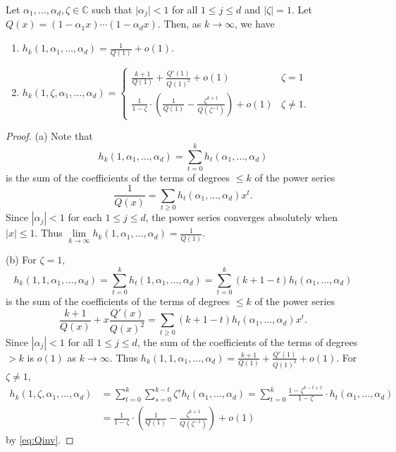 \documentclass[10pt,a4paper]{amsart}
\newcommand{\CC}{\mathbb{C}}
\begin{document}
\begin{lemma}\label{lem}
Let $\alpha_1,\dots,\alpha_d,\zeta\in \CC$ such that $\lvert \alpha_j\rvert 
<1$ for all $1\leqslant j\leqslant d$ and $\lvert \zeta\rvert = 1$. Let 
$Q(x)=(1-\alpha_1 x)\dotsm (1-\alpha_d x)$. Then, as $k\to \infty$, we have 
\begin{enumerate}
\item[(a)] $h_k(1,\alpha_1,\dots,\alpha_d)=\frac{1}{Q(1)}+o(1)$.
\item[(b)] 
    $h_k(1,\zeta,\alpha_1,\dots,\alpha_d)
    =\begin{cases}\frac{k+1}{Q(1)}+\frac{Q'(1)}{Q(1)^2}+o(1)&\zeta=1\\
    \frac{1}{1-\zeta}\cdot\left(\frac{1}{Q(1)}-\frac{\zeta^{k+1}}{Q(\zeta^{-1})}\right)+o(1)&\zeta\neq 
    1.\end{cases}$
\end{enumerate}
\end{lemma}

\begin{proof}
(a) Note that
\[
h_k(1,\alpha_1,\dots,\alpha_d)=\sum\limits_{t=0}^k 
h_t(\alpha_1,\dots,\alpha_d)
\]
is the sum of the coefficients of the terms of degrees $\leqslant k$ of the 
power series
\begin{equation}\label{eq:Qinv} 
\frac{1}{Q(x)}=\sum\limits_{t\geqslant 0} h_t(\alpha_1,\dots,\alpha_d)x^t.
\end{equation}
Since $|\alpha_j|< 1$ for each $1\leqslant j\leqslant d$, the power series 
converges absolutely when $|x|\leqslant 1$. Thus $\lim\limits_{k\to \infty} 
h_k(1,\alpha_1,\dots,\alpha_d)=\frac{1}{Q(1)}$. 

(b) For $\zeta=1$, 
\[
h_k(1,1,\alpha_1,\dots,\alpha_d)=
\sum\limits_{t=0}^k h_t(1,\alpha_1,\dots,\alpha_d)
=
\sum\limits_{t=0}^{k}(k+1-t)h_t(\alpha_1,\dots,\alpha_d)
\]
is the sum of the coefficients of the terms of degrees $\leqslant k$ of the power 
series
\[
\frac{k+1}{Q(x)}+x\frac{Q'(x)}{Q(x)^2}
=
\sum\limits_{t\geqslant 0}(k+1-t)h_t(\alpha_1,\dots,\alpha_d)x^t.
\]
Since $|\alpha_j|< 1$ for all $1\leqslant j\leqslant d$, the sum of the 
coefficients of the terms of degrees $>k$ is $o(1)$ as $k\to \infty$.  Thus 
$h_k(1,1,\alpha_1,\dots,\alpha_d)=\frac{k+1}{Q(1)}+\frac{Q'(1)}{Q(1)^2}+o(1)$. 
For $\zeta\neq 1$, 
\begin{align*}
h_k(1,\zeta,\alpha_1,\dots,\alpha_d)&=\sum_{t=0}^k \sum_{s=0}^{k-t}\zeta^{s}h_t(\alpha_1,\dots,\alpha_d)=\sum_{t=0}^k\frac{1-\zeta^{k-t+1}}{1-\zeta}\cdot h_t(\alpha_1,\dots,\alpha_d)\\
&=\frac{1}{1-\zeta}\cdot\left(\frac{1}{Q(1)}-\frac{\zeta^{k+1}}{Q(\zeta^{-1})}\right)+o(1)
\end{align*}
by \eqref{eq:Qinv}.
\end{proof}
\end{document}
